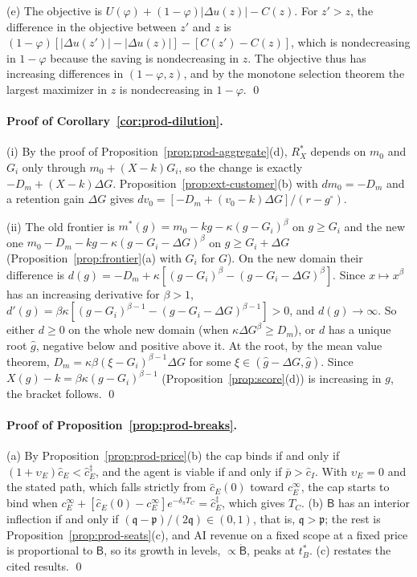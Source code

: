 (e) The objective is $U(\varphi)+(1-\varphi)|\Delta u(z)|-C(z)$. For $z'>z$, the difference in the objective between $z'$ and $z$ is $(1-\varphi)[|\Delta u(z')|-|\Delta u(z)|]-[C(z')-C(z)]$, which is nondecreasing in $1-\varphi$ because the saving is nondecreasing in $z$. The objective thus has increasing differences in $(1-\varphi,z)$, and by the monotone selection theorem \citep{milgrom1994monotone} the largest maximizer in $z$ is nondecreasing in $1-\varphi$. \qed

\paragraph{Proof of Corollary~\ref{cor:prod-dilution}.}
(i) By the proof of Proposition~\ref{prop:prod-aggregate}(d), $R^*_X$ depends on $m_0$ and $G_i$ only through $m_0+(X-k)G_i$, so the change is exactly $-D_m+(X-k)\Delta G$. Proposition~\ref{prop:ext-customer}(b) with $dm_0=-D_m$ and a retention gain $\Delta G$ gives $dv_0=[-D_m+(v_0-k)\Delta G]/(r-g^\circ)$.

(ii) The old frontier is $m^*(g)=m_0-kg-\kappa(g-G_i)^\beta$ on $g\ge G_i$ and the new one $m_0-D_m-kg-\kappa(g-G_i-\Delta G)^\beta$ on $g\ge G_i+\Delta G$ (Proposition~\ref{prop:frontier}(a) with $G_i$ for $G$). On the new domain their difference is $d(g)=-D_m+\kappa[(g-G_i)^\beta-(g-G_i-\Delta G)^\beta]$. Since $x\mapsto x^\beta$ has an increasing derivative for $\beta>1$, $d'(g)=\beta\kappa[(g-G_i)^{\beta-1}-(g-G_i-\Delta G)^{\beta-1}]>0$, and $d(g)\to\infty$. So either $d\ge 0$ on the whole new domain (when $\kappa\Delta G^\beta\ge D_m$), or $d$ has a unique root $\hat g$, negative below and positive above it. At the root, by the mean value theorem, $D_m=\kappa\beta(\xi-G_i)^{\beta-1}\Delta G$ for some $\xi\in(\hat g-\Delta G,\hat g)$. Since $X(g)-k=\beta\kappa(g-G_i)^{\beta-1}$ (Proposition~\ref{prop:score}(d)) is increasing in $g$, the bracket follows. \qed

\paragraph{Proof of Proposition~\ref{prop:prod-breaks}.}
(a) By Proposition~\ref{prop:prod-price}(b) the cap binds if and only if $(1+\upsilon_E)\hat c_E<\hat c^\ddagger_E$, and the agent is viable if and only if $\bar p>\hat c_I$. With $\upsilon_E=0$ and the stated path, which falls strictly from $\hat c_E(0)$ toward $c_E^\infty$, the cap starts to bind when $c_E^\infty+[\hat c_E(0)-c_E^\infty]e^{-\delta_\pi T_C}=\hat c^\ddagger_E$, which gives $T_C$. (b) $\mathsf B$ has an interior inflection if and only if $(\mathfrak q-\mathfrak p)/(2\mathfrak q)\in(0,1)$, that is, $\mathfrak q>\mathfrak p$; the rest is Proposition~\ref{prop:prod-seats}(c), and AI revenue on a fixed scope at a fixed price is proportional to $\mathsf B$, so its growth in levels, $\propto\dot{\mathsf B}$, peaks at $t^*_B$. (c) restates the cited results. \qed
